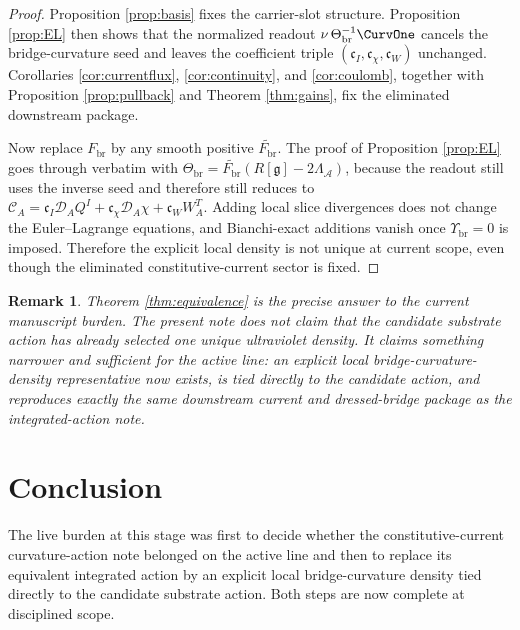 \documentclass[11pt]{article}
\newcommand{\Sub}{\mathcal{A}}
\newcommand{\BridgeMetric}{\mathfrak g}
\newcommand{\SpatialD}{\mathcal D}
\newcommand{\ConstCurrent}{\mathcal C}
\newcommand{\CurvSeed}{\Theta_{\mathrm{br}}}
\newcommand{\CurvSeedMult}{\Upsilon_{\mathrm{br}}}
\newcommand{\CurvProfile}{F_{\mathrm{br}}}
\newtheorem{remark}{Remark}
\begin{document}
\begin{proof}
Proposition \ref{prop:basis} fixes the carrier-slot structure. Proposition \ref{prop:EL} then shows that the normalized readout \(\nu\,\CurvSeed^{-1}\CurvOne\) cancels the bridge-curvature seed and leaves the coefficient triple \((\mathfrak c_I,\mathfrak c_\chi,\mathfrak c_W)\) unchanged. Corollaries \ref{cor:currentflux}, \ref{cor:continuity}, and \ref{cor:coulomb}, together with Proposition \ref{prop:pullback} and Theorem \ref{thm:gains}, fix the eliminated downstream package.

Now replace \(\CurvProfile\) by any smooth positive \(\widetilde{\CurvProfile}\). The proof of Proposition \ref{prop:EL} goes through verbatim with \(\CurvSeed=\widetilde{\CurvProfile}(R[\BridgeMetric]-2\Lambda_{\Sub})\), because the readout still uses the inverse seed and therefore still reduces to \(\ConstCurrent_A=\mathfrak c_I\SpatialD_AQ^I+\mathfrak c_\chi\SpatialD_A\chi+\mathfrak c_WW_A^T\). Adding local slice divergences does not change the Euler--Lagrange equations, and Bianchi-exact additions vanish once \(\CurvSeedMult=0\) is imposed. Therefore the explicit local density is not unique at current scope, even though the eliminated constitutive-current sector is fixed.
\end{proof}

\begin{remark}
Theorem \ref{thm:equivalence} is the precise answer to the current manuscript burden. The present note does not claim that the candidate substrate action has already selected one unique ultraviolet density. It claims something narrower and sufficient for the active line: an explicit local bridge-curvature-density representative now exists, is tied directly to the candidate action, and reproduces exactly the same downstream current and dressed-bridge package as the integrated-action note.
\end{remark}

\section{Conclusion}

The live burden at this stage was first to decide whether the constitutive-current curvature-action note belonged on the active line and then to replace its equivalent integrated action by an explicit local bridge-curvature density tied directly to the candidate substrate action. Both steps are now complete at disciplined scope.
\end{document}
